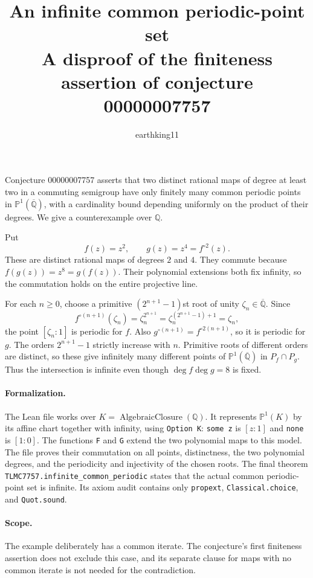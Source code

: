 \documentclass[11pt]{article}
\title{An infinite common periodic-point set\\
  A disproof of the finiteness assertion of conjecture 00000007757}
\author{earthking11}
\date{}
\begin{document}
\maketitle

Conjecture 00000007757 asserts that two distinct rational maps of degree at
least two in a commuting semigroup have only finitely many common periodic
points in $\mathbb P^1(\overline{\mathbb Q})$, with a cardinality bound
depending uniformly on the product of their degrees. We give a counterexample
over $\mathbb Q$.

Put
\[
  f(z)=z^2, \qquad g(z)=z^4=f^{\circ 2}(z).
\]
These are distinct rational maps of degrees $2$ and $4$. They commute because
$f(g(z))=z^8=g(f(z))$. Their polynomial extensions both fix infinity, so the
commutation holds on the entire projective line.

For each $n\geq 0$, choose a primitive $(2^{n+1}-1)$st root of unity
$\zeta_n\in\overline{\mathbb Q}$. Since
\[
  f^{\circ(n+1)}(\zeta_n)
  =\zeta_n^{2^{n+1}}
  =\zeta_n^{(2^{n+1}-1)+1}
  =\zeta_n,
\]
the point $[\zeta_n:1]$ is periodic for $f$. Also
$g^{\circ(n+1)}=f^{\circ 2(n+1)}$, so it is periodic for $g$.
The orders $2^{n+1}-1$ strictly increase with $n$. Primitive roots of
different orders are distinct, so these give infinitely many different
points of $\mathbb P^1(\overline{\mathbb Q})$ in $P_f\cap P_g$. Thus the
intersection is infinite even though $\deg f\deg g=8$ is fixed.

\paragraph{Formalization.}
The Lean file works over $K=\operatorname{AlgebraicClosure}(\mathbb Q)$.
It represents $\mathbb P^1(K)$ by its affine chart together with infinity,
using \texttt{Option K}: \texttt{some z} is $[z:1]$ and \texttt{none} is
$[1:0]$. The functions \texttt{F} and \texttt{G} extend the two polynomial
maps to this model. The file proves their commutation on all points,
distinctness, the two polynomial degrees, and the periodicity and injectivity
of the chosen roots. The final theorem
\texttt{TLMC7757.infinite\_common\_periodic} states that the actual common
periodic-point set is infinite. Its axiom audit contains only
\texttt{propext}, \texttt{Classical.choice}, and \texttt{Quot.sound}.

\paragraph{Scope.}
The example deliberately has a common iterate. The conjecture's first
finiteness assertion does not exclude this case, and its separate clause for
maps with no common iterate is not needed for the contradiction.
\end{document}
